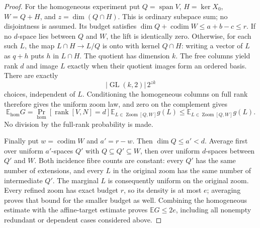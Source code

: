 \begin{proof}
For the homogeneous experiment put $Q=\operatorname{span}V$,
$H=\ker X_0$, $W=Q+H$, and $z=\dim(Q\cap H)$.
This is ordinary subspace sum; no disjointness is assumed.
Its budget satisfies $\dim Q+\operatorname{codim}W\le a+b-c\le r$.
If no $d$-space lies between $Q$ and $W$, the lift is identically zero.
Otherwise, for each such $L$, the map $L\cap H\to L/Q$ is onto
with kernel $Q\cap H$: writing a vector of $L$ as $q+h$ puts
$h$ in $L\cap H$. The quotient has dimension $k$.
The free columns yield rank $d$ and image $L$ exactly when their
quotient images form an ordered basis. There are exactly
\[
 |\operatorname{GL}(k,2)|\,2^{zk}
\]
choices, independent of $L$. Conditioning the homogeneous columns
on full rank therefore gives the uniform zoom law, and zero on the
complement gives
\[
 \mathbb E_{\mathrm{hom}}G
 =\Pr_{\mathrm{hom}}[\operatorname{rank}[V,N]=d]
       \mathbb E_{L\in\operatorname{Zoom}[Q,W]}g(L)
 \le \mathbb E_{L\in\operatorname{Zoom}[Q,W]}g(L).
\]
No division by the full-rank probability is made.

Finally put $w=\operatorname{codim}W$ and $a'=r-w$.
Then $\dim Q\le a'<d$. Average first over uniform $a'$-spaces
$Q'$ with $Q\subseteq Q'\subseteq W$, then over uniform $d$-spaces
between $Q'$ and $W$. Both incidence fibre counts are constant:
every $Q'$ has the same number of extensions, and every $L$ in the
original zoom has the same number of intermediate $Q'$.
The marginal $L$ is consequently uniform on the original zoom.
Every refined zoom has exact budget $r$, so its density is at most
$e$; averaging proves that bound for the smaller budget as well.
Combining the homogeneous estimate with the affine-target estimate
proves $\mathbb E G\le2e$, including all nonempty redundant or
dependent cases considered above.
\end{proof}

